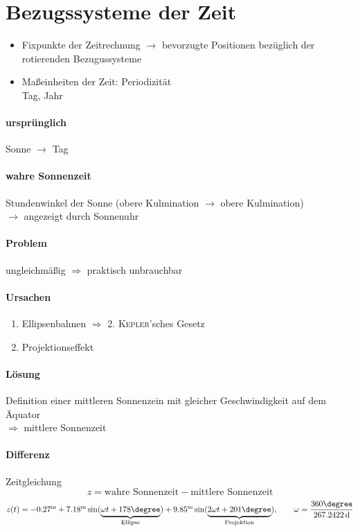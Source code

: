 \section{Bezugssysteme der Zeit}
\begin{itemize}
    \item Fixpunkte der Zeitrechnung $\rightarrow$ bevorzugte Positionen bezüglich
        der rotierenden Bezugussysteme
    \item Maßeinheiten der Zeit: Periodizität\\
        Tag, Jahr
\end{itemize}

\paragraph{ursprünglich} Sonne $\longrightarrow$ Tag
\paragraph{wahre Sonnenzeit} Stundenwinkel der Sonne (obere Kulmination $\longrightarrow$ obere Kulmination) \\
$\rightarrow$ angezeigt durch Sonnenuhr
\paragraph{Problem} ungleichmäßig $\Rightarrow$ praktisch unbrauchbar
\paragraph{Ursachen}
\begin{enumerate}
    \item Ellipsenbahnen $\Rightarrow$ 2. \textsc{Kepler}'sches Gesetz
    \item Projektionseffekt
\end{enumerate}

\paragraph{Lösung} Definition einer mittleren Sonnenzein mit gleicher
    Geschwindigkeit auf dem Äquator\\
    $\Rightarrow$ mittlere Sonnenzeit
\paragraph{Differenz} Zeitgleichung
\[ \boxed{z = \text{wahre Sonnenzeit} - \text{mittlere Sonnenzeit}} \]
\[ z(t) = -0.27^{\mathrm{m}} + 7.18^{\mathrm{m}} \sin(\underbrace{\omega t + 178\degree}_{\text{Ellipse}}) +
          9.85^{\mathrm{m}} \sin(\underbrace{2 \omega t + 201\degree}_{\text{Projektion}}), \qquad
      \omega = \frac{360\degree}{267.2422\,\mathrm{d}}\]

